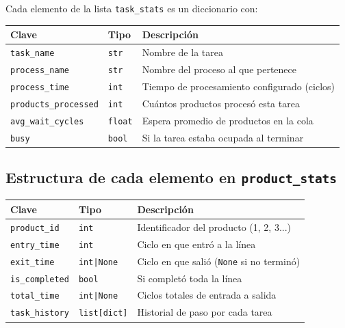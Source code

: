 \documentclass[12pt,letterpaper]{article}
\begin{document}
Cada elemento de la lista \texttt{task\_stats} es un diccionario con:

\begin{center}
\begin{tabularx}{\textwidth}{|l|l|X|}
\hline
\textbf{Clave} & \textbf{Tipo} & \textbf{Descripción} \\
\hline
\texttt{task\_name} & \texttt{str} & Nombre de la tarea \\
\hline
\texttt{process\_name} & \texttt{str} & Nombre del proceso al que pertenece \\
\hline
\texttt{process\_time} & \texttt{int} & Tiempo de procesamiento configurado (ciclos) \\
\hline
\texttt{products\_processed} & \texttt{int} & Cuántos productos procesó esta tarea \\
\hline
\texttt{avg\_wait\_cycles} & \texttt{float} & Espera promedio de productos en la cola \\
\hline
\texttt{busy} & \texttt{bool} & Si la tarea estaba ocupada al terminar \\
\hline
\end{tabularx}
\end{center}

\subsection{Estructura de cada elemento en \texttt{product\_stats}}

\begin{center}
\begin{tabularx}{\textwidth}{|l|l|X|}
\hline
\textbf{Clave} & \textbf{Tipo} & \textbf{Descripción} \\
\hline
\texttt{product\_id} & \texttt{int} & Identificador del producto (1, 2, 3...) \\
\hline
\texttt{entry\_time} & \texttt{int} & Ciclo en que entró a la línea \\
\hline
\texttt{exit\_time} & \texttt{int|None} & Ciclo en que salió (\texttt{None} si no terminó) \\
\hline
\texttt{is\_completed} & \texttt{bool} & Si completó toda la línea \\
\hline
\texttt{total\_time} & \texttt{int|None} & Ciclos totales de entrada a salida \\
\hline
\texttt{task\_history} & \texttt{list[dict]} & Historial de paso por cada tarea \\
\hline
\end{tabularx}
\end{center}
\end{document}
